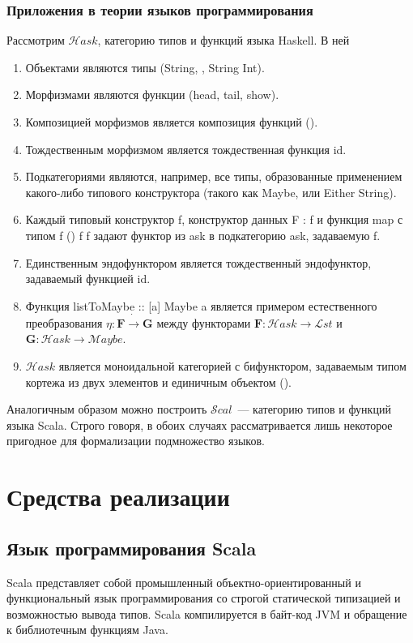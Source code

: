 \subsection{Приложения в теории языков программирования}
Рассмотрим $\mathcal{H}ask$, категорию типов и функций языка Haskell. В ней
\begin{enumerate}
  \item Объектами являются типы (\<String\>, \<[Int]\>, \<String \to Int\>).
  \item Морфизмами являются функции (\<head\>, \<tail\>, \<show\>).
  \item Композицией морфизмов является композиция функций \<(\circ)\>.
  \item Тождественным морфизмом является тождественная функция \<id\>.
  \item Подкатегориями являются, например, все типы, образованные применением какого-либо типового конструктора (такого как \<Maybe\>, \<[]\> или \<Either String\>).
  \item Каждый типовый конструктор \<f\>, конструктор данных \<F : \alpha \to f \alpha\> и функция \<map\> с типом \<f (\alpha \to \beta) \to f \alpha \to f \beta\> задают функтор из \<ask\> в подкатегорию \<ask\>, задаваемую \<f\>.
  \item Единственным эндофунктором является тождественный эндофунктор, задаваемый функцией \<id\>.
  \item Функция \<listToMaybe :: [a] \to Maybe a\> является примером естественного преобразования $\eta: \mathbf{F} \dot{\to} \mathbf{G}$ между функторами $\mathbf{F}: \mathcal{H}ask \to \mathcal{L}st$ и $\mathbf{G}: \mathcal{H}ask \to \mathcal{M}aybe$.
  \item $\mathcal{H}ask$ является моноидальной категорией с бифунктором, задаваемым типом кортежа из двух элементов и единичным объектом \<()\>. 
\end{enumerate}

Аналогичным образом можно построить $\mathcal{S}cal$~--- категорию типов и функций языка Scala. Строго говоря, в обоих случаях рассматривается лишь некоторое пригодное для формализации подмножество языков\cite{Danielsson2006}.

\chapter{Средства реализации}
\section{Язык программирования Scala}
Scala\cite{Odersky2004} представляет собой промышленный объектно-ориентирован\-ный и функциональный язык программирования со строгой статической типизацией и возможностью вывода типов. Scala компилируется в байт-код JVM и обращение к библиотечным функциям Java.

